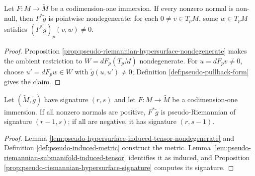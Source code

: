 \begin{lemma}
\label{lem:pseudo-hypersurface-induced-tensor-nondegenerate}
\leanok
{}
Let $F:M\to\widetilde M$ be a codimension-one immersion. If every nonzero normal is non-null, then $F^*\widetilde g$ is pointwise nondegenerate: for each $0\ne v\in T_pM$, some $w\in T_pM$ satisfies $(F^*\widetilde g)_p(v,w)\ne0$.
\end{lemma}
\begin{proof}
\leanok
{}
\sketch Proposition \ref{prop:pseudo-riemannian-hypersurface-nondegenerate} makes the ambient restriction to $W=dF_p(T_pM)$ nondegenerate. For $u=dF_pv\ne0$, choose $u'=dF_pw\in W$ with $\widetilde g(u,u')\ne0$; Definition \ref{def:pseudo-pullback-form} gives the claim.
\end{proof}

\begin{corollary}
\label{cor:pseudo-riemannian-hypersurface-submanifold}
\leanok
{}
Let $(\widetilde M,\widetilde g)$ have signature $(r,s)$ and let $F:M\to\widetilde M$ be a codimension-one immersion. If all nonzero normals are positive, $F^*\widetilde g$ is pseudo-Riemannian of signature $(r-1,s)$; if all are negative, it has signature $(r,s-1)$.
\end{corollary}
\begin{proof}
\leanok
{}
\sketch Lemma \ref{lem:pseudo-hypersurface-induced-tensor-nondegenerate} and Definition \ref{def:pseudo-induced-metric} construct the metric. Lemma \ref{lem:pseudo-riemannian-submanifold-induced-tensor} identifies it as induced, and Proposition \ref{prop:pseudo-riemannian-hypersurface-signature} computes its signature.
\end{proof}

